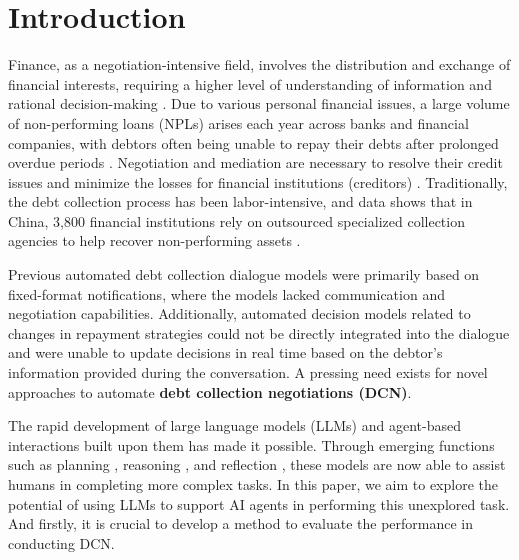 \section{Introduction}


Finance, as a negotiation-intensive field, involves the distribution and exchange of financial interests, requiring a higher level of understanding of information and rational decision-making \citep{Chan2006TheGN,Thompson1997TheMA}. Due to various personal financial issues, a large volume of non-performing loans (NPLs) arises each year across banks and financial companies, with debtors often being unable to repay their debts after prolonged overdue periods \citep{Ozili2019NonPerformingLA}. Negotiation and mediation are necessary to resolve their credit issues and minimize the losses for financial institutions (creditors) \citep{Firanda2021DebtCO}. Traditionally, the debt collection process has been labor-intensive, and data shows that in China, 3,800 financial institutions rely on outsourced specialized collection agencies to help recover non-performing assets \citep{Tang2018DebtCO}.


Previous automated debt collection dialogue models \citep{Floatbot2023GenerativeAI,Yahiya2024AutomatedDR} were primarily based on fixed-format notifications, where the models lacked communication and negotiation capabilities. Additionally, automated decision models \citep{Sancarlos2023TowardsAD,Jankowski2024DebtCM} related to changes in repayment strategies could not be directly integrated into the dialogue and were unable to update decisions in real time based on the debtor’s information provided during the conversation. A pressing need exists for novel approaches to automate \textbf{debt collection negotiations (DCN)}.

The rapid development of large language models (LLMs) \citep{Vicuna, LLaMA} and agent-based interactions \citep{luo2025llmpoweredmultiagentautomatedcrypto,chai2025flexquantelasticquantizationframework} built upon them has made it possible. Through emerging functions such as planning \citep{huang2024understanding}, reasoning \cite{aksitov2023rest}, and reflection \citep{renze2024self}, these models are now able to assist humans in completing more complex tasks. In this paper, we aim to explore the potential of using LLMs to support AI agents in performing this unexplored task. And firstly, it is crucial to develop a method to evaluate the performance in conducting DCN.

